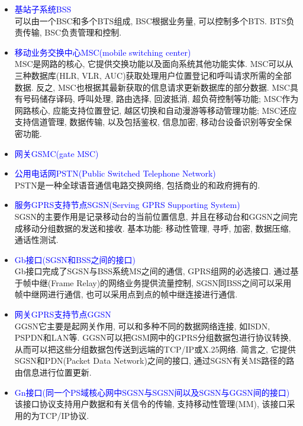 {\begin {itemize}
        \item { \textcolor {blue} {基站子系统BSS} } \\
        { 可以由一个BSC和多个BTS组成, BSC根据业务量, 可以控制多个BTS. BTS负责传输, BSC负责管理和控制. } \\

        \item { \textcolor {blue} {移动业务交换中心MSC(mobile switching center)} } \\
        { MSC是网路的核心, 它提供交换功能以及面向系统其他功能实体. MSC可以从三种数据库(HLR, VLR, AUC)获取处理用户位置登记和呼叫请求所需的全部数据. 反之, MSC也根据其最新获取的信息请求更新数据库的部分数据. MSC具有号码储存译码, 呼叫处理, 路由选择, 回波抵消, 超负荷控制等功能; MSC作为网路核心, 应能支持位置登记, 越区切换和自动漫游等移动管理功能; MSC还应支持信道管理, 数据传输, 以及包括鉴权, 信息加密, 移动台设备识别等安全保密功能. } \\

        \item { \textcolor {blue} {网关GSMC(gate MSC)} } \\

        \item { \textcolor {blue} {公用电话网PSTN(Public Switched Telephone Network) } } \\
        { PSTN是一种全球语音通信电路交换网络, 包括商业的和政府拥有的. } \\

        \item { \textcolor {blue} {服务GPRS支持节点SGSN(Serving GPRS Supporting System)} } \\
        { SGSN的主要作用是记录移动台的当前位置信息, 并且在移动台和GGSN之间完成移动分组数据的发送和接收. 基本功能: 移动性管理, 寻呼, 加密, 数据压缩, 通话性测试. } \\

        \item { \textcolor {blue} {Gb接口(SGSN和BSS之间的接口)} } \\
        { Gb接口完成了SGSN与BSS系统MS之间的通信, GPRS组网的必选接口. 通过基于帧中继(Frame Relay)的网络业务提供流量控制, SGSN同BSS之间可以采用帧中继网进行通信, 也可以采用点到点的帧中继连接进行通信. } \\

        \item { \textcolor {blue} {网关GPRS支持节点GGSN} } \\
        { GGSN它主要是起网关作用, 可以和多种不同的数据网络连接, 如ISDN, PSPDN和LAN等. GGSN可以把GSM网中的GPRS分组数据包进行协议转换, 从而可以把这些分组数据包传送到远端的TCP/IP或X.25网络. 简言之, 它提供SGSN和PDN(Packet Data Network)之间的接口, 通过SGSN有关MS路径的路由信息进行位置更新. } \\

        \item { \textcolor {blue} {Gn接口(同一个PS域核心网中SGSN与SGSN间以及SGSN与GGSN间的接口)} } \\
        { 该接口协议支持用户数据和有关信令的传输, 支持移动性管理(MM), 该接口采用的为TCP/IP协议. } \\

    \end {itemize}
}


